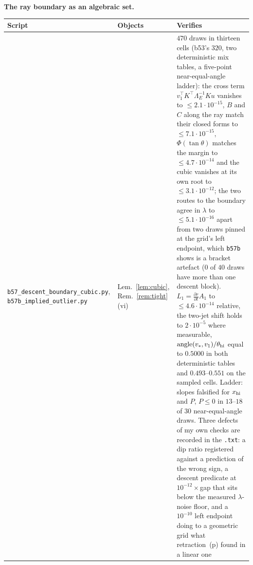 \documentclass[11pt]{article}
\theoremstyle{remark}
\newcommand{\Le}{\Lambda_E}
\begin{document}
\noindent\textbf{The ray boundary as an algebraic set.}
\begin{center}\footnotesize\begin{tabular}{@{}>{\raggedright\arraybackslash}p{5.1cm}%
>{\raggedright\arraybackslash}p{2.5cm}>{\raggedright\arraybackslash}p{5.8cm}@{}}
\toprule Script & Objects & Verifies\\
\midrule
\texttt{b57\_descent\_boundary\_cubic.py}, \texttt{b57b\_implied\_outlier.py} &
Lem.~\ref{lem:cubic}, Rem.~\ref{rem:tight}(vi) &
$470$ draws in thirteen cells (b53's $320$, two deterministic mix tables, a five-point
near-equal-angle ladder): the cross term $v_1^{\top}K^{\top}\Le^{-1}Ku$ vanishes to
$\le2.1\cdot10^{-15}$, $B$ and $C$ along the ray match their closed forms to $\le7.1\cdot10^{-15}$,
$\Phi(\tan\theta)$ matches the margin to $\le4.7\cdot10^{-14}$ and the cubic vanishes at its own root
to $\le3.1\cdot10^{-12}$; the two routes to the boundary agree in $\lambda$ to $\le5.1\cdot10^{-16}$
apart from two draws pinned at the grid's left endpoint, which \texttt{b57b} shows is a bracket
artefact ($0$ of $40$ draws have more than one descent block). $L_1=\frac{\partial r}{\partial t}A_1$
to $\le4.6\cdot10^{-14}$ relative, the two-jet shift holds to $2\cdot10^{-5}$ where measurable,
$\operatorname{angle}(v_\ast,v_1)/\theta_{\rm hi}$ equal to $0.5000$ in both deterministic tables and
$0.493$--$0.551$ on the sampled cells. Ladder:
slopes falsified for $x_{\rm hi}$ and $P$, $P\le0$ in $13$--$18$ of $30$ near-equal-angle draws.
Three defects of my own checks are recorded in the \texttt{.txt}: a dip ratio registered against a
prediction of the wrong sign, a descent predicate at $10^{-12}\times$gap that sits below the measured
$\lambda$-noise floor, and a $10^{-10}$ left endpoint doing to a geometric grid what
retraction~(p) found in a linear one\\
\bottomrule
\end{tabular}\end{center}
\end{document}
